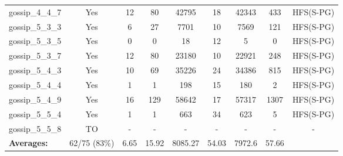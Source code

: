 \documentclass{article}
\begin{document}
\begin{tabular}{lcccccccc}
gossip\_4\_4\_7 & Yes & 12 & 80 & 42795 & 18 & 42343 & 433 & HFS(S-PG) \\
gossip\_5\_3\_3 & Yes & 6 & 27 & 7701 & 10 & 7569 & 121 & HFS(S-PG) \\
gossip\_5\_3\_5 & Yes & 0 & 0 & 18 & 12 & 5 & 0 & HFS(S-PG) \\
gossip\_5\_3\_7 & Yes & 12 & 80 & 23180 & 10 & 22921 & 248 & HFS(S-PG) \\
gossip\_5\_4\_3 & Yes & 10 & 69 & 35226 & 24 & 34386 & 815 & HFS(S-PG) \\
gossip\_5\_4\_4 & Yes & 1 & 1 & 198 & 15 & 180 & 2 & HFS(S-PG) \\
gossip\_5\_4\_9 & Yes & 16 & 129 & 58642 & 17 & 57317 & 1307 & HFS(S-PG) \\
gossip\_5\_5\_4 & Yes & 1 & 1 & 663 & 34 & 623 & 5 & HFS(S-PG) \\
gossip\_5\_5\_8 & TO & - & - & - & - & - & - & - \\
\textbf{Averages:} & 62/75 (83\%) & 6.65 & 15.92 & 8085.27 & 54.03 & 7972.6 & 57.66 & \\
\bottomrule
\end{tabular}
\\[0.7cm]
\end{document}
